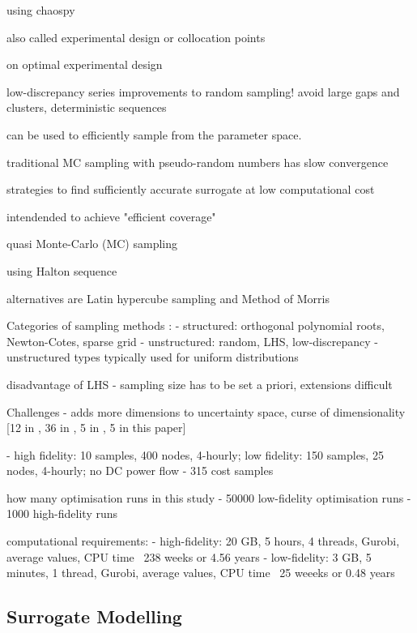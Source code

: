 using chaospy \cite{feinberg_chaospy_2015}

also called experimental design or collocation points

on optimal experimental design \cite{fajraoui_optimal_2017}

low-discrepancy series improvements to random sampling! avoid large gaps and clusters, deterministic sequences

can be used to efficiently sample from the parameter space.

traditional MC sampling with pseudo-random numbers has slow convergence %

strategies to find sufficiently accurate surrogate at low computational cost \cite{fajraoui_optimal_2017}

intendended to achieve "efficient coverage" \cite{usher_value_2015}

quasi Monte-Carlo (MC) sampling

using Halton sequence

alternatives are Latin hypercube sampling \cite{trondle_trade-offs_2020} and Method of Morris \cite{usher_value_2015,mavromatidis_uncertainty_2018}

Categories of sampling methods \cite{palar_multi-fidelity_2016}:
- structured: orthogonal polynomial roots, Newton-Cotes, sparse grid
- unstructured: random, LHS, low-discrepancy
- unstructured types typically used for uniform distributions

disadvantage of LHS \cite{fajraoui_optimal_2017}
- sampling size has to be set a priori, extensions difficult

Challenges
- adds more dimensions to uncertainty space, curse of dimensionality [12 in \cite{trondle_trade-offs_2020}, 36 in \cite{pilpola_analyzing_2020}, 5 in \cite{shirizadeh_how_2019}, 5 in this paper]

- \cite{trondle_trade-offs_2020} high fidelity: 10 samples, 400 nodes, 4-hourly; low fidelity: 150 samples, 25 nodes, 4-hourly; no DC power flow
- \cite{shirizadeh_how_2019} 315 cost samples

how many optimisation runs in this study
- 50000 low-fidelity optimisation runs
- 1000 high-fidelity runs

computational requirements:
- high-fidelity: 20 GB, 5 hours, 4 threads, Gurobi, average values, CPU time ~238 weeks or 4.56 years
- low-fidelity: 3 GB, 5 minutes, 1 thread, Gurobi, average values, CPU time ~25 weeeks or 0.48 years

\subsection{Surrogate Modelling}
\label{sec:surrogate}

